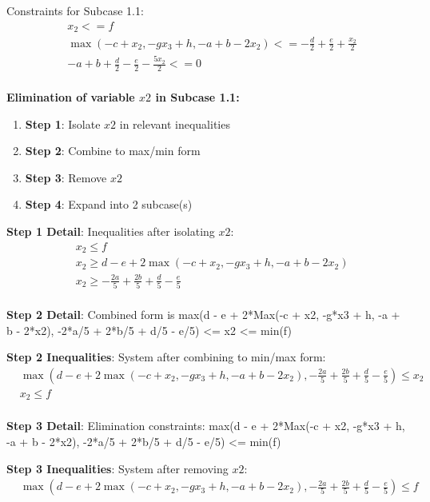 \documentclass{article}
\begin{document}
Constraints for Subcase 1.1:
\begin{align}
& x_{2} <= f \\
& \max\left(- c + x_{2}, - g x_{3} + h, - a + b - 2 x_{2}\right) <= - \frac{d}{2} + \frac{e}{2} + \frac{x_{2}}{2} \\
& - a + b + \frac{d}{2} - \frac{e}{2} - \frac{5 x_{2}}{2} <= 0 \\
\end{align}

\textbf{Elimination of variable $x2$ in Subcase 1.1:}

\begin{enumerate}
\item \textbf{Step 1}: Isolate $x2$ in relevant inequalities
\item \textbf{Step 2}: Combine to max/min form
\item \textbf{Step 3}: Remove $x2$
\item \textbf{Step 4}: Expand into 2 subcase(s)
\end{enumerate}

\textbf{Step 1 Detail}: Inequalities after isolating $x2$:
\begin{align}
& x_{2} \leq f \\
& x_{2} \geq d - e + 2 \max\left(- c + x_{2}, - g x_{3} + h, - a + b - 2 x_{2}\right) \\
& x_{2} \geq - \frac{2 a}{5} + \frac{2 b}{5} + \frac{d}{5} - \frac{e}{5} \\
\end{align}

\textbf{Step 2 Detail}: Combined form is max(d - e + 2*Max(-c + x2, -g*x3 + h, -a + b - 2*x2), -2*a/5 + 2*b/5 + d/5 - e/5) <= x2 <= min(f)

\textbf{Step 2 Inequalities}: System after combining to min/max form:
\begin{align}
& \max\left(d - e + 2 \max\left(- c + x_{2}, - g x_{3} + h, - a + b - 2 x_{2}\right), - \frac{2 a}{5} + \frac{2 b}{5} + \frac{d}{5} - \frac{e}{5}\right) \leq x_{2} \\
& x_{2} \leq f \\
\end{align}

\textbf{Step 3 Detail}: Elimination constraints:
\quad max(d - e + 2*Max(-c + x2, -g*x3 + h, -a + b - 2*x2), -2*a/5 + 2*b/5 + d/5 - e/5) <= min(f)

\textbf{Step 3 Inequalities}: System after removing $x2$:
\begin{align}
& \max\left(d - e + 2 \max\left(- c + x_{2}, - g x_{3} + h, - a + b - 2 x_{2}\right), - \frac{2 a}{5} + \frac{2 b}{5} + \frac{d}{5} - \frac{e}{5}\right) \leq f \\
\end{align}
\end{document}

